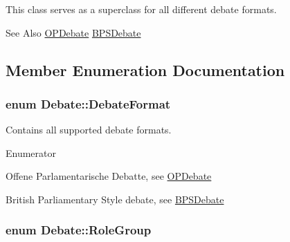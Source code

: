 This class serves as a superclass for all different debate formats. \begin{DoxySeeAlso}{See Also}
\hyperlink{classOPDebate}{O\-P\-Debate} \hyperlink{classBPSDebate}{B\-P\-S\-Debate} 
\end{DoxySeeAlso}


\subsection{Member Enumeration Documentation}
\hypertarget{classDebate_a537fac343de1edd412012e4180b52e04}{
\subsubsection[{Debate\-Format}]{\setlength{\rightskip}{0pt plus 5cm}enum {\bf Debate\-::\-Debate\-Format}}}\label{classDebate_a537fac343de1edd412012e4180b52e04}


Contains all supported debate formats. 

\begin{Desc}
\item[Enumerator]\par
\begin{description}
\item[{\em 
\hypertarget{classDebate_a537fac343de1edd412012e4180b52e04a57900d539b2f8b08fba5e1df1622a3ad}{O\-P\-D}\label{classDebate_a537fac343de1edd412012e4180b52e04a57900d539b2f8b08fba5e1df1622a3ad}
}]Offene Parlamentarische Debatte, see \hyperlink{classOPDebate}{O\-P\-Debate} \item[{\em 
\hypertarget{classDebate_a537fac343de1edd412012e4180b52e04afbefbbcc339cee2cb34f1be57d2168da}{B\-P\-S}\label{classDebate_a537fac343de1edd412012e4180b52e04afbefbbcc339cee2cb34f1be57d2168da}
}]British Parliamentary Style debate, see \hyperlink{classBPSDebate}{B\-P\-S\-Debate} \end{description}
\end{Desc}
\hypertarget{classDebate_ae9871a36a2f3de7a7da8922d70fbece4}{
\subsubsection[{Role\-Group}]{\setlength{\rightskip}{0pt plus 5cm}enum {\bf Debate\-::\-Role\-Group}}}\label{classDebate_ae9871a36a2f3de7a7da8922d70fbece4}


